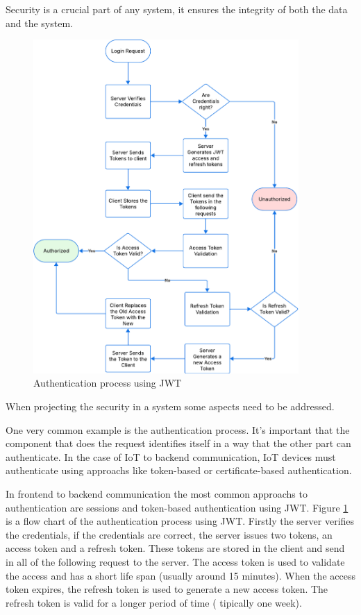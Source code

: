 Security is a crucial part of any system, it ensures the integrity of both
the data and the system.

\begin{figure}[htbp]
	\centering
	\includegraphics[width=0.9\textwidth, height=0.6\textheight, keepaspectratio]{Chapters/Figures/Security/JWT.pdf}
	\caption{Authentication process using \gls{JWT}}
	\label{fig:security:JWT}
\end{figure}

When projecting the security in a system some
aspects need to be addressed.

One very common example is the
authentication process.
It's important that the component that does the request identifies itself
in a way that the other part can authenticate.
In the case of \gls{IoT} to backend communication, \gls{IoT} devices must authenticate
using approachs like token-based or certificate-based authentication\cite{schiller2022landscape}.

In frontend to backend communication the most common approachs to
authentication are sessions and token-based authentication using \gls{JWT}.
Figure \ref{fig:security:JWT}
is a flow chart of the authentication process using \gls{JWT}.
Firstly the server verifies the credentials, if the credentials are
correct, the server issues two tokens, an access token and a refresh
token. These tokens are stored in the client and send in all of the
following request to the server. The access token is used to validate
the access and has a short life span (usually around 15 minutes). When
the access token expires, the refresh token is used to generate a new
access token. The refresh token is valid for a longer period of time (
tipically one week).

